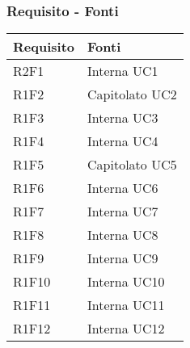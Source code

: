 \subsubsection{Requisito - Fonti}
\begin{center}
	\begin{longtable}{|p{22mm}|p{44mm}|}
		\hline
		\rowcolor{lighter-grayer}
		\textbf{Requisito} &  \textbf{Fonti}  \\
		\hline
		\endhead
		
		

R2F1 &
Interna \newline
UC1 
\\
\hline

R1F2 &
Capitolato \newline
UC2 
\\
\hline

R1F3 &
Interna \newline
UC3 
\\
\hline

R1F4 &
Interna \newline
UC4 
\\
\hline

R1F5 &
Capitolato \newline
UC5 
\\
\hline

R1F6 &
Interna \newline
UC6 
\\
\hline

R1F7 &
Interna \newline
UC7 
\\
\hline

R1F8 &
Interna \newline
UC8 
\\
\hline

R1F9 &
Interna \newline
UC9 
\\
\hline

R1F10 &
Interna \newline
UC10 
\\
\hline

R1F11 &
Interna \newline
UC11 
\\
\hline

R1F12 &
Interna \newline
UC12 
\\
\hline


\end{longtable}
\end{center}
